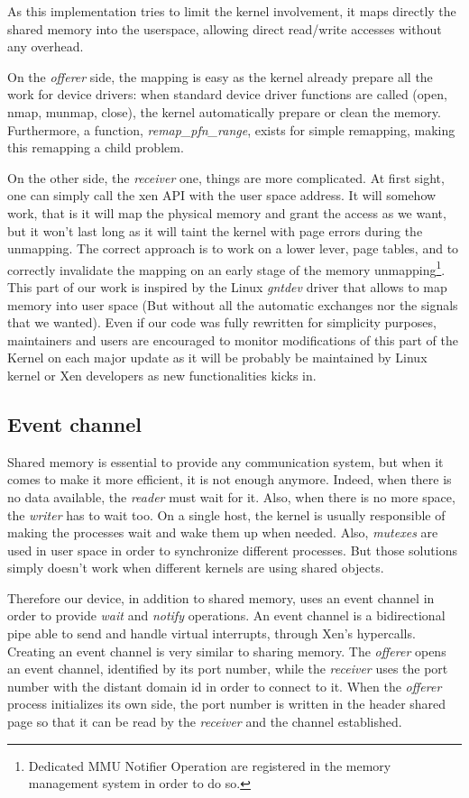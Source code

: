 \documentclass[journal]{IEEEtran}
\begin{document}
As this implementation tries to limit the kernel involvement, it maps directly the shared memory into the userspace, allowing direct read/write accesses without any overhead.

On the \emph{offerer} side, the mapping is easy as the kernel already prepare all the work for device drivers: when standard device driver functions are called (open, nmap, munmap, close), the kernel automatically prepare or clean the memory. Furthermore, a function, \emph{remap\_pfn\_range}, exists for simple remapping, making this remapping a child problem.

On the other side, the \emph{receiver} one, things are more complicated. At first sight, one can simply call the xen API with the user space address. It will somehow work, that is it will map the physical memory and grant the access as we want, but it won't last long as it will taint the kernel with page errors during the unmapping.
The correct approach is to work on a lower lever, page tables, and to correctly invalidate the mapping on an early stage of the memory unmapping\footnote{Dedicated MMU Notifier Operation are registered in the memory management system in order to do so.}.
This part of our work is inspired by the Linux \emph{gntdev} driver that allows to map memory into user space (But without all the automatic exchanges nor the signals that we wanted). Even if our code was fully rewritten for simplicity purposes, maintainers and users are encouraged to monitor modifications of this part of the Kernel on each major update as it will be probably be maintained by Linux kernel or Xen developers as new functionalities kicks in.

\subsection{Event channel}

Shared memory is essential to provide any communication system, but when it comes to make it more efficient, it is not enough anymore. Indeed, when there is no data available, the \emph{reader} must wait for it. Also, when there is no more space, the \emph{writer} has to wait too. On a single host, the kernel is usually responsible of making the processes wait and wake them up when needed. Also, \emph{mutexes} are used in user space in order to synchronize different processes. But those solutions simply doesn't work when different kernels are using shared objects.

Therefore our device, in addition to shared memory, uses an event channel in order to provide \emph{wait} and \emph{notify} operations. An event channel is a bidirectional pipe able to send and handle virtual interrupts, through Xen's hypercalls. Creating an event channel is very similar to sharing memory. The \emph{offerer} opens an event channel, identified by its port number, while the \emph{receiver} uses the port number with the distant domain id in order to connect to it.
When the \emph{offerer} process initializes its own side, the port number is written in the header shared page so that it can be read by the \emph{receiver} and the channel established. 
\end{document}
